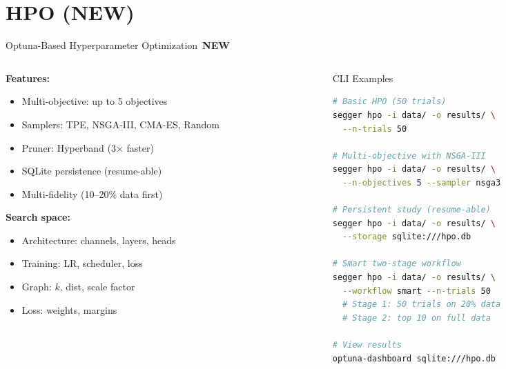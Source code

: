 \documentclass[aspectratio=169,10pt]{beamer}
\newcommand{\NEW}{\,{\scriptsize\colorbox{newgreen}{\color{white}\textbf{NEW}}}\,}
\begin{document}
\section{HPO (NEW)}

\begin{frame}[fragile]{Optuna-Based Hyperparameter Optimization \NEW}

\begin{columns}[T]
\begin{column}{0.48\textwidth}
{\small
\textbf{Features:}
\begin{itemize}\setlength\itemsep{1pt}
  \item Multi-objective: up to 5 objectives
  \item Samplers: TPE, NSGA-III, CMA-ES, Random
  \item Pruner: Hyperband (3$\times$ faster)
  \item SQLite persistence (resume-able)
  \item Multi-fidelity (10--20\% data first)
\end{itemize}

\textbf{Search space:}
\begin{itemize}\setlength\itemsep{1pt}
  \item Architecture: channels, layers, heads
  \item Training: LR, scheduler, loss
  \item Graph: $k$, dist, scale factor
  \item Loss: weights, margins
\end{itemize}
}
\end{column}

\begin{column}{0.48\textwidth}
\begin{exampleblock}{CLI Examples}
\begin{lstlisting}[language=bash]
# Basic HPO (50 trials)
segger hpo -i data/ -o results/ \
  --n-trials 50

# Multi-objective with NSGA-III
segger hpo -i data/ -o results/ \
  --n-objectives 5 --sampler nsga3

# Persistent study (resume-able)
segger hpo -i data/ -o results/ \
  --storage sqlite:///hpo.db

# Smart two-stage workflow
segger hpo -i data/ -o results/ \
  --workflow smart --n-trials 50
  # Stage 1: 50 trials on 20% data
  # Stage 2: top 10 on full data

# View results
optuna-dashboard sqlite:///hpo.db
\end{lstlisting}
\end{exampleblock}
\end{column}
\end{columns}
\end{frame}
\end{document}
